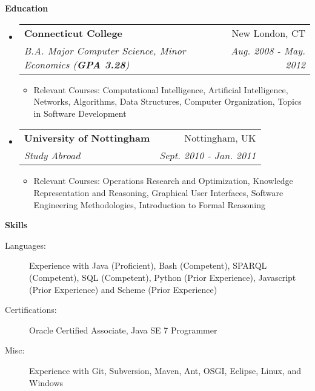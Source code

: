 \documentclass[letterpaper,11pt]{article}
\makeatletter
\newcommand{\resitem}[1]{\item #1 \vspace{-2pt}}
\newcommand{\resheading}[1]{{\large \colorbox{mygrey}{\begin{minipage}{\textwidth}{\textbf{#1 \vphantom{p\^{E}}}}\end{minipage}}}}
\newcommand{\ressubheading}[4]{
\begin{tabular*}{7.0in}{l@{\extracolsep{\fill}}r}
		\textbf{#1} & #2 \\
		\textit{#3} & \textit{#4} \\
\end{tabular*}\vspace{-6pt}}
\makeatother
\begin{document}
\resheading{Education}
\begin{itemize}
	\item
	\ressubheading{Connecticut College}{New London, CT}{B.A. Major Computer Science, Minor Economics (\textbf{GPA 3.28})}{Aug. 2008 - May. 2012}
	\begin{itemize}
		\resitem{Relevant Courses: Computational Intelligence, Artificial Intelligence, Networks, Algorithms, Data Structures, Computer Organization, Topics in Software Development}
	\end{itemize}
	
	\item
	\ressubheading{University of Nottingham}{Nottingham, UK}{Study Abroad}{Sept. 2010 - Jan. 2011}
	\begin{itemize}
		\resitem{Relevant Courses: Operations Research and Optimization, Knowledge Representation and Reasoning, Graphical User Interfaces, Software Engineering Methodologies, Introduction to Formal Reasoning}
	\end{itemize}
\end{itemize}

\resheading{Skills}
\begin{description}
	\item[Languages:]
		Experience with Java (Proficient), Bash (Competent), SPARQL (Competent), SQL (Competent), Python (Prior Experience), Javascript (Prior Experience) and Scheme (Prior Experience)
	\item[Certifications:]
		Oracle Certified Associate, Java SE 7 Programmer
	\item[Misc:]
		Experience with Git, Subversion, Maven, Ant, OSGI, Eclipse, Linux, and Windows
\end{description}
\end{document}

